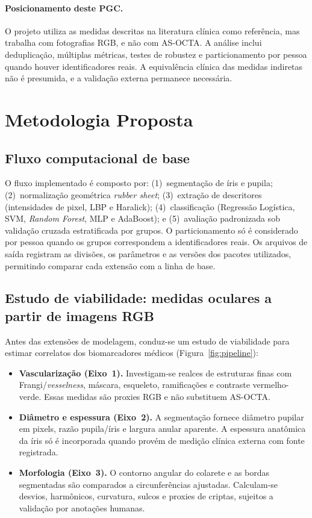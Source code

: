 \documentclass[12pt,a4paper]{article}
\begin{document}
\paragraph{Posicionamento deste PGC.}
O projeto utiliza as medidas descritas na literatura clínica como referência, mas trabalha com
fotografias RGB, e não com AS-OCTA. A análise inclui deduplicação, múltiplas métricas, testes de
robustez e particionamento por pessoa quando houver identificadores reais. A equivalência clínica das
medidas indiretas não é presumida, e a validação externa permanece necessária.

\section{Metodologia Proposta}

\subsection{Fluxo computacional de base}
O fluxo implementado é composto por:
(1)~segmentação de íris e pupila; (2)~normalização geométrica \emph{rubber sheet}; (3)~extração de
descritores (intensidades de pixel, LBP e Haralick); (4)~classificação (Regressão Logística, SVM,
\emph{Random Forest}, MLP e AdaBoost); e (5)~avaliação padronizada sob validação cruzada estratificada
por grupos. O particionamento só é considerado por pessoa quando os grupos correspondem a
identificadores reais. Os arquivos de saída registram as divisões, os parâmetros e as versões dos
pacotes utilizados, permitindo comparar cada extensão com a linha de base.

\subsection{Estudo de viabilidade: medidas oculares a partir de imagens RGB}
Antes das extensões de modelagem, conduz-se um estudo de viabilidade para estimar correlatos dos
biomarcadores médicos (Figura~\ref{fig:pipeline}):

\begin{itemize}
    \item \textbf{Vascularização (Eixo~1).} Investigam-se realces de estruturas finas com
    Frangi/\emph{vesselness}, máscara, esqueleto, ramificações e contraste vermelho-verde. Essas
    medidas são proxies RGB e não substituem AS-OCTA.
    \item \textbf{Diâmetro e espessura (Eixo~2).} A segmentação fornece diâmetro pupilar em pixels,
    razão pupila/íris e largura anular aparente. A espessura anatômica da íris só é incorporada quando
    provém de medição clínica externa com fonte registrada.
    \item \textbf{Morfologia (Eixo~3).} O contorno angular do colarete e as bordas segmentadas são
    comparados a circunferências ajustadas. Calculam-se desvios, harmônicos, curvatura, sulcos e
    proxies de criptas, sujeitos a validação por anotações humanas.
\end{itemize}
\end{document}
